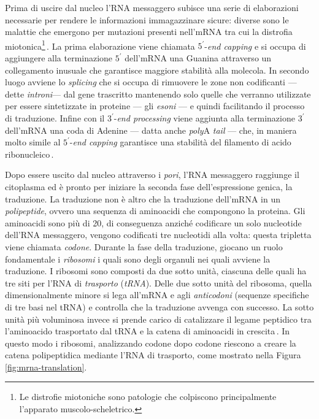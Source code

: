 Prima di uscire dal nucleo l'RNA messaggero subisce una serie di elaborazioni necessarie per rendere le informazioni immagazzinare sicure: diverse sono le malattie che emergono per mutazioni presenti nell'mRNA tra cui la distrofia miotonica\footnote{Le distrofie miotoniche sono patologie che colpiscono principalmente l'apparato muscolo-scheletrico.}\,\cite{philips2000rna}. La prima elaborazione viene chiamata $5^\prime$-\textit{end capping} e si occupa di aggiungere alla terminazione $5^\prime$ dell'mRNA una Guanina attraverso un collegamento inusuale che garantisce maggiore stabilità alla molecola. In secondo luogo avviene lo \textit{splicing} che si occupa di rimuovere le zone non codificanti — dette \textsl{introni}— dal gene trascritto mantenendo solo quelle che verranno utilizzate per essere sintetizzate in proteine — gli \textsl{esoni} — e quindi facilitando il processo di traduzione. Infine con il $3^\prime$-\textit{end processing} viene aggiunta alla terminazione $3^\prime$ dell'mRNA una coda di Adenine — datta anche \textit{poly}A \textit{tail} — che, in maniera molto simile al $5^\prime$-\textit{end capping} garantisce una stabilità del filamento di acido ribonucleico\,\cite{hocine2010rna, livingstone2010mechanisms}.

Dopo essere uscito dal nucleo attraverso i \textsl{pori}, l'RNA messaggero raggiunge il citoplasma ed è pronto per iniziare la seconda fase dell'espressione genica, la traduzione. La traduzione non è altro che la traduzione dell'mRNA in un \textsl{polipeptide}, ovvero una sequenza di aminoacidi che compongono la proteina. Gli aminoacidi sono più di 20, di conseguenza anziché codificare un solo nucleotide dell'RNA messaggero, vengono codificati tre nucleotidi alla volta: questa tripletta viene chiamata \textsl{codone}. Durante la fase della traduzione, giocano un ruolo fondamentale i \textsl{ribosomi} i quali sono degli organuli nei quali avviene la traduzione. I ribosomi sono composti da due sotto unità, ciascuna delle quali ha tre siti per l'RNA di \textsl{trasporto} (\textsl{tRNA}). Delle due sotto unità del ribosoma, quella dimensionalmente minore si lega all'mRNA e agli \textsl{anticodoni} (sequenze specifiche di tre basi nel tRNA) e controlla che la traduzione avvenga con successo. La sotto unità più voluminosa invece si prende carico di catalizzare il legame peptidico tra l'aminoacido trasportato dal tRNA e la catena di aminoacidi in crescita\,\cite{ramakrishnan2002ribosome, lemonniermarathon, livingstone2010mechanisms}. In questo modo i ribosomi, analizzando codone dopo codone riescono a creare la catena polipeptidica mediante l'RNA di trasporto, come mostrato nella Figura\,\ref{fig:mrna-translation}.

